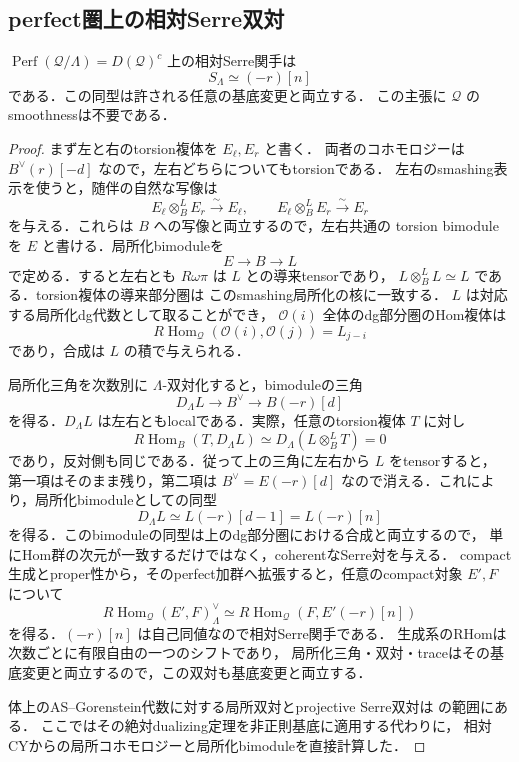 \subsection{perfect圏上の相対Serre双対}
\begin{theorem}\label{thm:finite-tails-relative-serre}
$\operatorname{Perf}(\mathcal Q/\Lambda)=D(\mathcal Q)^c$ 上の相対Serre関手は
\[
 S_\Lambda\simeq(-r)[n]
\]
である．この同型は許される任意の基底変更と両立する．
この主張に $\mathcal Q$ のsmoothnessは不要である．
\end{theorem}
\begin{proof}
まず左と右のtorsion複体を $E_\ell,E_r$ と書く．
両者のコホモロジーは $B^\vee(r)[-d]$ なので，左右どちらについてもtorsionである．
左右のsmashing表示を使うと，随伴の自然な写像は
\[
 E_\ell\otimes_B^L E_r\xrightarrow{\sim}E_\ell,
 \qquad E_\ell\otimes_B^L E_r\xrightarrow{\sim}E_r
\]
を与える．これらは $B$ への写像と両立するので，左右共通の
torsion bimoduleを $E$ と書ける．局所化bimoduleを
\[
 E\longrightarrow B\longrightarrow L
\]
で定める．すると左右とも $R\omega\pi$ は $L$ との導来tensorであり，
$L\otimes_B^LL\simeq L$ である．torsion複体の導来部分圏は
このsmashing局所化の核に一致する．
$L$ は対応する局所化dg代数として取ることができ，
$\mathcal O(i)$ 全体のdg部分圏のHom複体は
\[
 R\!\operatorname{Hom}_{\mathcal Q}(\mathcal O(i),\mathcal O(j))
       =L_{j-i}
\]
であり，合成は $L$ の積で与えられる．

局所化三角を次数別に $\Lambda$-双対化すると，bimoduleの三角
\[
 D_\Lambda L\longrightarrow B^\vee
       \longrightarrow B(-r)[d]
\]
を得る．$D_\Lambda L$ は左右ともlocalである．実際，任意のtorsion複体 $T$ に対し
\[
 R\!\operatorname{Hom}_B(T,D_\Lambda L)
       \simeq D_\Lambda(L\otimes_B^LT)=0
\]
であり，反対側も同じである．従って上の三角に左右から $L$ をtensorすると，
第一項はそのまま残り，第二項は
$B^\vee=E(-r)[d]$ なので消える．これにより，局所化bimoduleとしての同型
\[
 D_\Lambda L\simeq L(-r)[d-1]=L(-r)[n]
\]
を得る．このbimoduleの同型は上のdg部分圏における合成と両立するので，
単にHom群の次元が一致するだけではなく，coherentなSerre対を与える．
compact生成とproper性から，そのperfect加群へ拡張すると，任意のcompact対象 $E',F$ について
\[
 R\!\operatorname{Hom}_{\mathcal Q}(E',F)^\vee_\Lambda
       \simeq R\!\operatorname{Hom}_{\mathcal Q}(F,E'(-r)[n])
\]
を得る．$(-r)[n]$ は自己同値なので相対Serre関手である．
生成系のRHomは次数ごとに有限自由の一つのシフトであり，
局所化三角・双対・traceはその基底変更と両立するので，この双対も基底変更と両立する．

体上のAS--Gorenstein代数に対する局所双対とprojective Serre双対は
\cite[Theorem 4.2, Corollary 4.3]{YZ1997}の範囲にある．
ここではその絶対dualizing定理を非正則基底に適用する代わりに，
相対CYからの局所コホモロジーと局所化bimoduleを直接計算した．
\end{proof}

